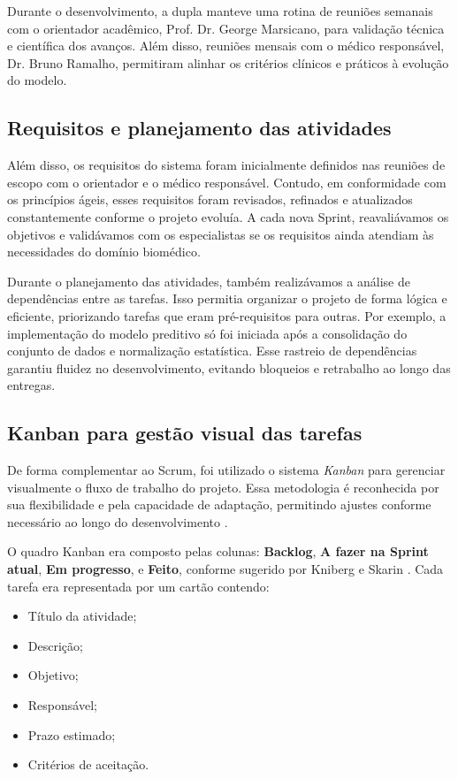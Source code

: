 Durante o desenvolvimento, a dupla manteve uma rotina de reuniões semanais com o orientador acadêmico, Prof. Dr. George Marsicano, para validação técnica e científica dos avanços. Além disso, reuniões mensais com o médico responsável, Dr. Bruno Ramalho, permitiram alinhar os critérios clínicos e práticos à evolução do modelo.

\subsection{Requisitos e planejamento das atividades}
Além disso, os requisitos do sistema foram inicialmente definidos nas reuniões de escopo com o orientador e o médico responsável. Contudo, em conformidade com os princípios ágeis, esses requisitos foram revisados, refinados e atualizados constantemente conforme o projeto evoluía. A cada nova Sprint, reavaliávamos os objetivos e validávamos com os especialistas se os requisitos ainda atendiam às necessidades do domínio biomédico.

Durante o planejamento das atividades, também realizávamos a análise de dependências entre as tarefas. Isso permitia organizar o projeto de forma lógica e eficiente, priorizando tarefas que eram pré-requisitos para outras. Por exemplo, a implementação do modelo preditivo só foi iniciada após a consolidação do conjunto de dados e normalização estatística. Esse rastreio de dependências garantiu fluidez no desenvolvimento, evitando bloqueios e retrabalho ao longo das entregas.

\subsection{Kanban para gestão visual das tarefas}
De forma complementar ao Scrum, foi utilizado o sistema \textit{Kanban} para gerenciar visualmente o fluxo de trabalho do projeto. Essa metodologia é reconhecida por sua flexibilidade e pela capacidade de adaptação, permitindo ajustes conforme necessário ao longo do desenvolvimento \cite{kniberg2010kanban}.

O quadro Kanban era composto pelas colunas: \textbf{Backlog}, \textbf{A fazer na Sprint atual}, \textbf{Em progresso}, e \textbf{Feito}, conforme sugerido por Kniberg e Skarin \cite{kniberg2010kanban}. Cada tarefa era representada por um cartão contendo:
\begin{itemize}
    \item Título da atividade;
    \item Descrição;
    \item Objetivo;
    \item Responsável;
    \item Prazo estimado;
    \item Critérios de aceitação.
\end{itemize}


